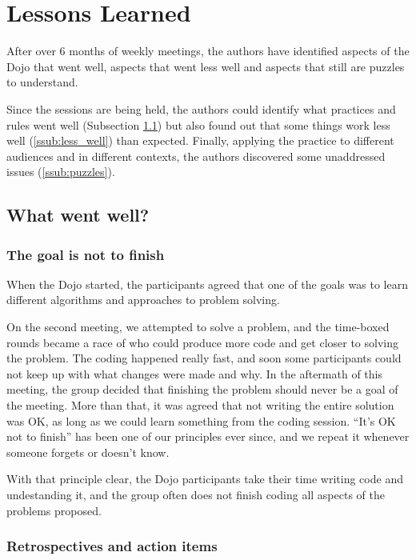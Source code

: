 \section{Lessons Learned}\label{sec:lessons_learned}

After over 6 months of weekly meetings, the authors have identified
aspects of the Dojo that went well, aspects that went less well and
aspects that still are puzzles to understand.

Since the sessions are being held, the authors could identify what
practices and rules went well (Subsection \ref{ssub:well}) but also
found out that some things work less well (\ref{ssub:less_well}) than
expected. Finally, applying the practice to different audiences and in
different contexts, the authors discovered some unaddressed issues
(\ref{ssub:puzzles}).

\subsection{What went well?}\label{ssub:well}

\subsubsection{The goal is not to finish}

When the Dojo started, the participants agreed that one of the goals
was to learn different algorithms and approaches to problem solving.

On the second meeting, we attempted to solve a problem, and the
time-boxed rounds became a race of who could produce more code and get
closer to solving the problem. The coding happened really fast, and
soon some participants could not keep up with what changes were made
and why. In the aftermath of this meeting, the group decided that
finishing the problem should never be a goal of the meeting. More than
that, it was agreed that not writing the entire solution was OK, as
long as we could learn something from the coding session. ``It's OK
not to finish'' has been one of our principles ever since, and we
repeat it whenever someone forgets or doesn't know.

With that principle clear, the Dojo participants take their time
writing code and undestanding it, and the group often does not finish
coding all aspects of the problems proposed.

\subsubsection{Retrospectives and action items}

